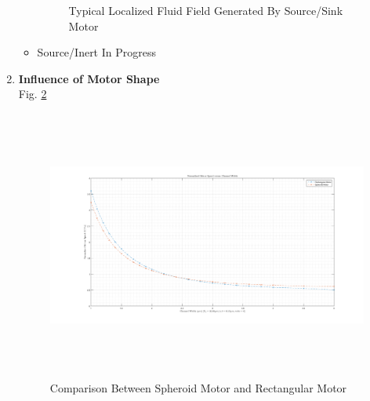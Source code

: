 \documentclass[fontsize=11pt, %
                             paper=a4, %
                             twoside, %
                             captions=tableheading,
                             index=totoc,
                             hyperref]{labbook}
\begin{document}
\begin{enumerate}
\begin{itemize}
\begin{figure}
\caption{Typical Localized Fluid Field Generated By Source/Sink Motor}\label{2016-12-18-TLFFGBSSM}
\end{figure}
\item Source/Inert In Progress
\end{itemize}
\item \textbf{Influence of Motor Shape}\\
Fig. \ref{2016-12-18-CBSMARM}
\begin{figure}
\centering
\includegraphics[width=\linewidth, height=3.5in]{2016-12-18-InfluenceOfMotorShape.png}
\caption{Comparison Between Spheroid Motor and Rectangular Motor}\label{2016-12-18-CBSMARM}
\end{figure}
\end{enumerate}
\end{document}
